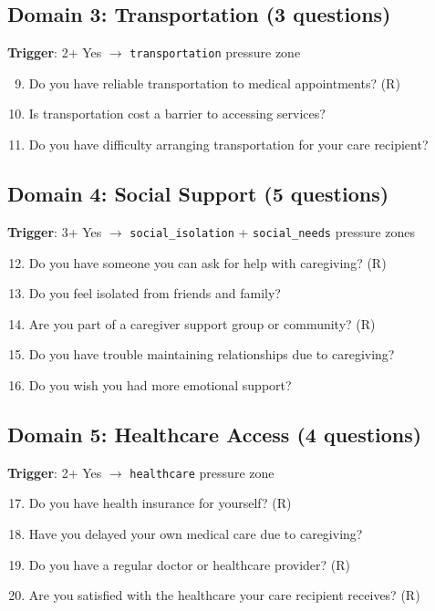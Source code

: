 \documentclass{article}
\begin{document}
\subsection*{Domain 3: Transportation (3 questions)}
\textbf{Trigger}: 2+ Yes $\rightarrow$ \texttt{transportation} pressure zone

\begin{enumerate}
    \setcounter{enumi}{8}
    \item Do you have reliable transportation to medical appointments? (R)
    \item Is transportation cost a barrier to accessing services?
    \item Do you have difficulty arranging transportation for your care recipient?
\end{enumerate}

\subsection*{Domain 4: Social Support (5 questions)}
\textbf{Trigger}: 3+ Yes $\rightarrow$ \texttt{social\_isolation} + \texttt{social\_needs} pressure zones

\begin{enumerate}
    \setcounter{enumi}{11}
    \item Do you have someone you can ask for help with caregiving? (R)
    \item Do you feel isolated from friends and family?
    \item Are you part of a caregiver support group or community? (R)
    \item Do you have trouble maintaining relationships due to caregiving?
    \item Do you wish you had more emotional support?
\end{enumerate}

\subsection*{Domain 5: Healthcare Access (4 questions)}
\textbf{Trigger}: 2+ Yes $\rightarrow$ \texttt{healthcare} pressure zone

\begin{enumerate}
    \setcounter{enumi}{16}
    \item Do you have health insurance for yourself? (R)
    \item Have you delayed your own medical care due to caregiving?
    \item Do you have a regular doctor or healthcare provider? (R)
    \item Are you satisfied with the healthcare your care recipient receives? (R)
\end{enumerate}
\end{document}
